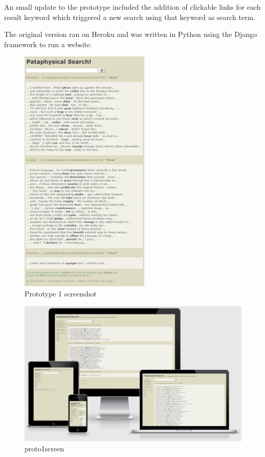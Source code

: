 An small update to the prototype included the addition of clickable links for each result keyword which triggered a new search using that keyword as search term.

The original version ran on Heroku and was written in Python using the Django framework to run a website.


\begin{figure}[!htbp] %
  \centering
  \includegraphics[height=0.6\textheight]{images/prototype01}
\caption[Prototype 1 screenshot]{Prototype 1 screenshot}
\label{img:Prototype1x}
\end{figure}

\begin{figure}[!htbp] %
  \centering
  \includegraphics[width=\linewidth]{images/proto1screen}
\caption[proto1screen]{proto1screen}
\label{img:proto1screen}
\end{figure}

